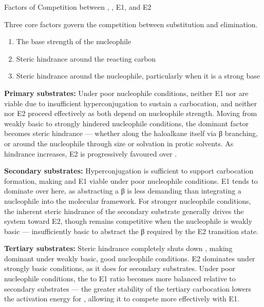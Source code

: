 \documentclass[10pt]{article}
\begin{document}
  \begin{core}{Factors of Competition between \snt, \sno, E1, and E2}

    Three core factors govern the competition between substitution and elimination.

    \begin{enumerate}


\item The base strength of the nucleophile

\item Steric hindrance around the reacting carbon

      \item Steric hindrance around the nucleophile, particularly when it is a strong base

    
\end{enumerate}

    \textbf{Primary substrates:} Under poor nucleophile conditions, neither E1 nor \sno are viable due to insufficient hyperconjugation to sustain a carbocation, and neither \snt nor E2 proceed effectively as both depend on nucleophile strength. Moving from weakly basic to strongly hindered nucleophile conditions, the dominant factor becomes steric hindrance --- whether along the haloalkane itself via β branching, or around the nucleophile through size or solvation in protic solvents. As hindrance increases, E2 is progressively favoured over \snt.

    \textbf{Secondary substrates:} Hyperconjugation is sufficient to support carbocation formation, making \sno and E1 viable under poor nucleophile conditions. E1 tends to dominate over \sno here, as abstracting a β  is less demanding than integrating a nucleophile into the molecular framework. For stronger nucleophile conditions, the inherent steric hindrance of the secondary substrate generally drives the system toward E2, though \snt remains competitive when the nucleophile is weakly basic --- insufficiently basic to abstract the β  required by the E2 transition state.

    \textbf{Tertiary substrates:} Steric hindrance completely shuts down \snt, making \sno dominant under weakly basic, good nucleophile conditions. E2 dominates under strongly basic conditions, as it does for secondary substrates. Under poor nucleophile conditions, the \sno to E1 ratio becomes more balanced relative to secondary substrates --- the greater stability of the tertiary carbocation lowers the activation energy for \sno, allowing it to compete more effectively with E1.


\end{core}
\end{document}
